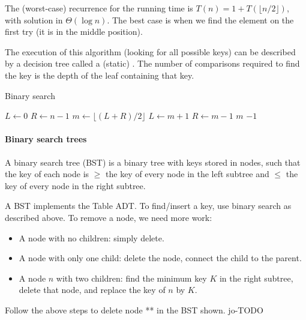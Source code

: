 The (worst-case) recurrence for the running time is $T(n) = 1 +  T(\lfloor n/2 \rfloor)$, with 
solution in $\Theta(\log n)$. The best case is when we find the element on the first try (it is in the middle position).

The execution of this algorithm (looking for all possible keys) can be 
described by a decision tree called a (static) . The 
number of comparisons required to find the key is the depth of the leaf 
containing that key.


\begin{algorithm}[H]
  \caption{Binary search
    \label{alg:binsearch}}
\begin{algorithmic}[1]
	\State $L \gets 0$
	\State $R \gets n-1$
		\State $m \gets \lfloor (L+R)/2\rfloor$ 
			\State $L\gets m+1$
			\State $R\gets m-1$
		\Else 
			\State \Return $m$ 
		\EndIf
	\EndWhile
	\Return $-1$ 
\EndFunction
\end{algorithmic}
\end{algorithm}

\paragraph{Binary search trees}
\begin{Definition}
A {binary search tree} (BST) is a binary tree with keys stored in nodes, 
such that the key of each node is $\geq$ the key of every node in the left subtree and $\leq$ 
the key of  every node in the right subtree.
\end{Definition}


A BST implements the Table ADT. To find/insert a key, use binary search as 
described above. To remove a node, we need more work:
\begin{itemize}
\item A node with no children: simply delete.
\item A node with only one child: delete the node, connect the child 
to the parent.
\item A node $n$ with two children: find the minimum key $K$ in the 
right subtree, delete that node, and replace the key of $n$ by $K$.
\end{itemize}

\begin{Boxample}[4]
Follow the above steps to delete node ** in the BST shown.
jo-TODO
\end{Boxample}


